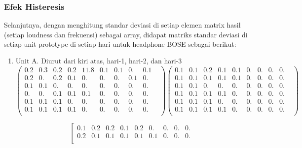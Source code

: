 \documentclass[12pt,]{article}
\begin{document}
	\subsubsection{Efek Histeresis}

	Selanjutnya, dengan menghitung standar deviasi di setiap elemen matrix hasil (setiap loudness dan frekuensi) sebagai array,
	didapat matriks standar deviasi di setiap unit prototype di setiap hari untuk headphone BOSE sebagai berikut:

	\begin{enumerate}
		\item Unit A. Diurut dari kiri atas, hari-1, hari-2, dan hari-3
		\[ \left( \begin{matrix}
			0.2&0.3&0.2&0.2&11.8&0.1&0.1&0.&0.1\\

			0.2&0.&0.2&0.1&0.&0.&0.&0.1&0.&\\

			0.1&0.1&0.&0.&0.&0.&0.&0.&0.&\\

			0.&0.&0.1&0.1&0.1&0.&0.&0.&0.&\\

			0.1&0.1&0.1&0.&0.&0.&0.&0.&0.&\\

			0.1&0.1&0.1&0.1&0.&0.&0.&0.&0.&\\
		\end{matrix} \right)
		\left( \begin{matrix}
			0.1&0.1&0.2&0.1&0.1&0.&0.&0.&0.&\\

			0.1&0.1&0.1&0.1&0.1&0.&0.&0.&0.&\\

			0.1&0.1&0.&0.&0.&0.&0.&0.&0.&\\

			0.1&0.1&0.1&0.1&0.&0.&0.&0.&0.&\\

			0.1&0.1&0.1&0.&0.&0.&0.&0.&0.&\\

			0.1&0.1&0.1&0.1&0.&0.&0.&0.&0.&\\
		\end{matrix} \right)
		\]

		\[\left[
		\begin{matrix}
			0.1&0.2&0.2&0.1&0.2&0.&0.&0.&0.&\\

			0.2&0.1&0.1&0.1&0.1&0.1&0.&0.&0.&\\


\end{matrix}\]
\end{enumerate}
\end{document}

